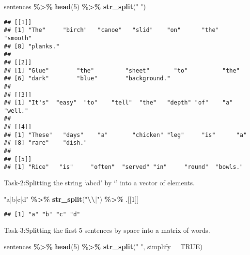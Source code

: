 \documentclass[
]{article}
\newenvironment{Shaded}{\begin{snugshade}}{\end{snugshade}}
\newcommand{\AttributeTok}[1]{\textcolor[rgb]{0.13,0.29,0.53}{#1}}
\newcommand{\ConstantTok}[1]{\textcolor[rgb]{0.56,0.35,0.01}{#1}}
\newcommand{\DecValTok}[1]{\textcolor[rgb]{0.00,0.00,0.81}{#1}}
\newcommand{\FunctionTok}[1]{\textcolor[rgb]{0.13,0.29,0.53}{\textbf{#1}}}
\newcommand{\NormalTok}[1]{#1}
\newcommand{\SpecialCharTok}[1]{\textcolor[rgb]{0.81,0.36,0.00}{\textbf{#1}}}
\newcommand{\StringTok}[1]{\textcolor[rgb]{0.31,0.60,0.02}{#1}}
\begin{document}
\begin{Shaded}
\begin{Highlighting}[]
\NormalTok{sentences }\SpecialCharTok{\%\textgreater{}\%}
  \FunctionTok{head}\NormalTok{(}\DecValTok{5}\NormalTok{) }\SpecialCharTok{\%\textgreater{}\%} 
  \FunctionTok{str\_split}\NormalTok{(}\StringTok{" "}\NormalTok{)}
\end{Highlighting}
\end{Shaded}

\begin{verbatim}
## [[1]]
## [1] "The"     "birch"   "canoe"   "slid"    "on"      "the"     "smooth" 
## [8] "planks."
## 
## [[2]]
## [1] "Glue"        "the"         "sheet"       "to"          "the"        
## [6] "dark"        "blue"        "background."
## 
## [[3]]
## [1] "It's"  "easy"  "to"    "tell"  "the"   "depth" "of"    "a"     "well."
## 
## [[4]]
## [1] "These"   "days"    "a"       "chicken" "leg"     "is"      "a"      
## [8] "rare"    "dish."  
## 
## [[5]]
## [1] "Rice"   "is"     "often"  "served" "in"     "round"  "bowls."
\end{verbatim}

Task-2:Splitting the string `a\textbar b\textbar c\textbar d' by
`\textbar{}' into a vector of elements.

\begin{Shaded}
\begin{Highlighting}[]
\StringTok{"a|b|c|d"} \SpecialCharTok{\%\textgreater{}\%} 
  \FunctionTok{str\_split}\NormalTok{(}\StringTok{"}\SpecialCharTok{\textbackslash{}\textbackslash{}}\StringTok{|"}\NormalTok{) }\SpecialCharTok{\%\textgreater{}\%} 
\NormalTok{  .[[}\DecValTok{1}\NormalTok{]]}
\end{Highlighting}
\end{Shaded}

\begin{verbatim}
## [1] "a" "b" "c" "d"
\end{verbatim}

Task-3:Splitting the first 5 sentences by space into a matrix of words.

\begin{Shaded}
\begin{Highlighting}[]
\NormalTok{sentences }\SpecialCharTok{\%\textgreater{}\%}
  \FunctionTok{head}\NormalTok{(}\DecValTok{5}\NormalTok{) }\SpecialCharTok{\%\textgreater{}\%} 
  \FunctionTok{str\_split}\NormalTok{(}\StringTok{" "}\NormalTok{, }\AttributeTok{simplify =} \ConstantTok{TRUE}\NormalTok{)}
\end{Highlighting}
\end{Shaded}
\end{document}
